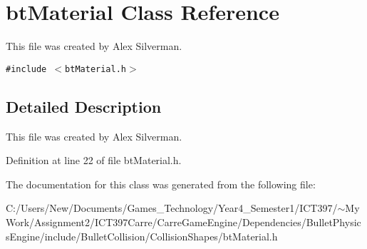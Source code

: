 \hypertarget{classbt_material}{
\section{btMaterial Class Reference}
\label{classbt_material}
}
This file was created by Alex Silverman.  


{\tt \#include $<$btMaterial.h$>$}



\subsection{Detailed Description}
This file was created by Alex Silverman. 

Definition at line 22 of file btMaterial.h.

The documentation for this class was generated from the following file:\begin{CompactItemize}
\item 
C:/Users/New/Documents/Games\_\-Technology/Year4\_\-Semester1/ICT397/$\sim$My Work/Assignment2/ICT397Carre/CarreGameEngine/Dependencies/BulletPhysicsEngine/include/BulletCollision/CollisionShapes/btMaterial.h\end{CompactItemize}
